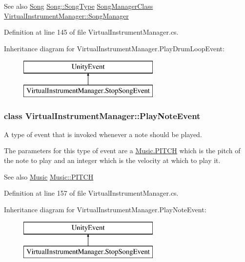 \begin{DoxySeeAlso}{See also}
\hyperlink{class_song}{Song} \hyperlink{group___song_enums_gae681a1f001333e39fc1cb4fea97bfe1b}{Song\+::\+Song\+Type} \hyperlink{class_song_manager_class}{Song\+Manager\+Class} \hyperlink{group___v_i_m_pub_ga33dae94932c10c66db76a0eebec76b01}{Virtual\+Instrument\+Manager\+::\+Song\+Manager} 
\end{DoxySeeAlso}


Definition at line 145 of file Virtual\+Instrument\+Manager.\+cs.

Inheritance diagram for Virtual\+Instrument\+Manager.\+Play\+Drum\+Loop\+Event\+:\begin{figure}[H]
\begin{center}
\leavevmode
\includegraphics[height=2.000000cm]{group___v_i_m_event_types}
\end{center}
\end{figure}
\label{class_virtual_instrument_manager_1_1_play_note_event}
\subsubsection{class Virtual\+Instrument\+Manager\+:\+:Play\+Note\+Event}
A type of event that is invoked whenever a note should be played. 

The parameters for this type of event are a \hyperlink{group___music_enums_ga508f69b199ea518f935486c990edac1d}{Music.\+P\+I\+T\+CH} which is the pitch of the note to play and an integer which is the velocity at which to play it.

\begin{DoxySeeAlso}{See also}
\hyperlink{class_music}{Music} \hyperlink{group___music_enums_ga508f69b199ea518f935486c990edac1d}{Music\+::\+P\+I\+T\+CH} 
\end{DoxySeeAlso}


Definition at line 157 of file Virtual\+Instrument\+Manager.\+cs.

Inheritance diagram for Virtual\+Instrument\+Manager.\+Play\+Note\+Event\+:\begin{figure}[H]
\begin{center}
\leavevmode
\includegraphics[height=2.000000cm]{group___v_i_m_event_types}
\end{center}
\end{figure}
\label{class_virtual_instrument_manager_1_1_play_song_event}
